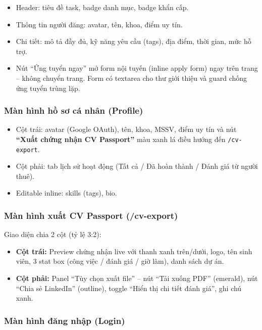 \begin{itemize}
  \item Header: tiêu đề task, badge danh mục, badge khẩn cấp.
  \item Thông tin người đăng: avatar, tên, khoa, điểm uy tín.
  \item Chi tiết: mô tả đầy đủ, kỹ năng yêu cầu (tags), địa điểm, thời gian, mức hỗ trợ.
  \item Nút ``Ứng tuyển ngay'' mở form nội tuyến (inline apply form) ngay trên trang -- không
    chuyển trang. Form có textarea cho thư giới thiệu và guard chống ứng tuyển trùng lặp.
\end{itemize}

\subsubsection{Màn hình hồ sơ cá nhân (Profile)}

\begin{itemize}
  \item Cột trái: avatar (Google OAuth), tên, khoa, MSSV, điểm uy tín và nút
    \textbf{``Xuất chứng nhận CV Passport''} màu xanh lá điều hướng đến \texttt{/cv-export}.
  \item Cột phải: tab lịch sử hoạt động (Tất cả / Đã hoàn thành / Đánh giá từ người thuê).
  \item Editable inline: skills (tags), bio.
\end{itemize}

\subsubsection{Màn hình xuất CV Passport (/cv-export)}

Giao diện chia 2 cột (tỷ lệ 3:2):
\begin{itemize}
  \item \textbf{Cột trái:} Preview chứng nhận live với thanh xanh trên/dưới, logo, tên sinh
    viên, 3 stat box (công việc / đánh giá / giờ làm), danh sách dự án.
  \item \textbf{Cột phải:} Panel ``Tùy chọn xuất file'' -- nút ``Tải xuống PDF'' (emerald),
    nút ``Chia sẻ LinkedIn'' (outline), toggle ``Hiển thị chi tiết đánh giá'', ghi chú xanh.
\end{itemize}

\subsubsection{Màn hình đăng nhập (Login)}

